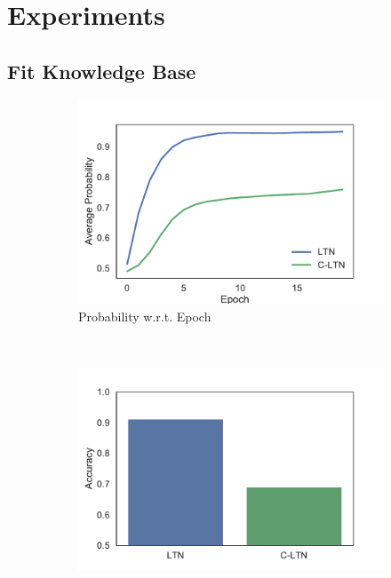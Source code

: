 
\section{Experiments}

\subsection{Fit Knowledge Base}

\begin{figure}[!]
    \centering
    \begin{subfigure}[]{0.33\textwidth}
        \includegraphics[width=\textwidth]{img/curve1.pdf}
        \caption{Probability w.r.t. Epoch}
        \label{fig:fitting-prob-epoch}
    \end{subfigure}~~~~
    \begin{subfigure}[]{0.33\textwidth}
        \includegraphics[width=\textwidth]{img/bar1.pdf}

\end{subfigure}
\end{figure}
